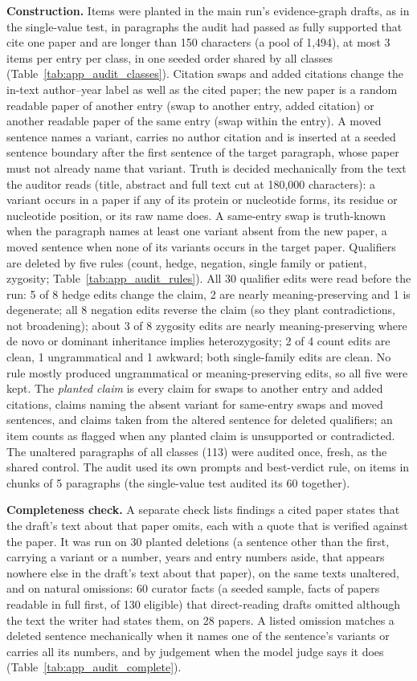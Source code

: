 \documentclass{article} %
\begin{document}
\textbf{Construction.} Items were planted in the main run's evidence-graph drafts, as in the single-value test, in paragraphs the audit had passed as fully supported that cite one paper and are longer than 150 characters (a pool of 1,494), at most 3 items per entry per class, in one seeded order shared by all classes (Table~\ref{tab:app_audit_classes}). Citation swaps and added citations change the in-text author--year label as well as the cited paper; the new paper is a random readable paper of another entry (swap to another entry, added citation) or another readable paper of the same entry (swap within the entry). A moved sentence names a variant, carries no author citation and is inserted at a seeded sentence boundary after the first sentence of the target paragraph, whose paper must not already name that variant. Truth is decided mechanically from the text the auditor reads (title, abstract and full text cut at 180,000 characters): a variant occurs in a paper if any of its protein or nucleotide forms, its residue or nucleotide position, or its raw name does. A same-entry swap is truth-known when the paragraph names at least one variant absent from the new paper, a moved sentence when none of its variants occurs in the target paper. Qualifiers are deleted by five rules (count, hedge, negation, single family or patient, zygosity; Table~\ref{tab:app_audit_rules}). All 30 qualifier edits were read before the run: 5 of 8 hedge edits change the claim, 2 are nearly meaning-preserving and 1 is degenerate; all 8 negation edits reverse the claim (so they plant contradictions, not broadening); about 3 of 8 zygosity edits are nearly meaning-preserving where de novo or dominant inheritance implies heterozygosity; 2 of 4 count edits are clean, 1 ungrammatical and 1 awkward; both single-family edits are clean. No rule mostly produced ungrammatical or meaning-preserving edits, so all five were kept. The \emph{planted claim} is every claim for swaps to another entry and added citations, claims naming the absent variant for same-entry swaps and moved sentences, and claims taken from the altered sentence for deleted qualifiers; an item counts as flagged when any planted claim is unsupported or contradicted. The unaltered paragraphs of all classes (113) were audited once, fresh, as the shared control. The audit used its own prompts and best-verdict rule, on items in chunks of 5 paragraphs (the single-value test audited its 60 together).

\textbf{Completeness check.} A separate check lists findings a cited paper states that the draft's text about that paper omits, each with a quote that is verified against the paper. It was run on 30 planted deletions (a sentence other than the first, carrying a variant or a number, years and entry numbers aside, that appears nowhere else in the draft's text about that paper), on the same texts unaltered, and on natural omissions: 60 curator facts (a seeded sample, facts of papers readable in full first, of 130 eligible) that direct-reading drafts omitted although the text the writer had states them, on 28 papers. A listed omission matches a deleted sentence mechanically when it names one of the sentence's variants or carries all its numbers, and by judgement when the model judge says it does (Table~\ref{tab:app_audit_complete}).
\end{document}

